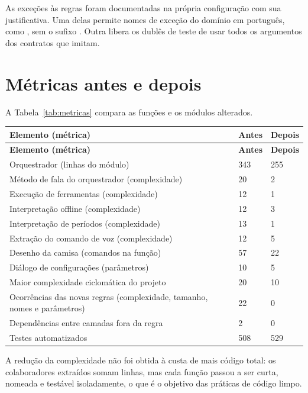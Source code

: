 As exceções às regras foram documentadas na própria configuração com sua justificativa. Uma delas
permite nomes de exceção do domínio em português, como , sem o sufixo
. Outra libera os dublês de teste de usar todos os argumentos dos contratos que imitam.

\section{Métricas antes e depois}

A Tabela~\ref{tab:metricas} compara as funções e os módulos alterados.

\begin{singlespace}
\label{tab:metricas}
\small
\begin{tabularx}{\textwidth}{LC{2.6cm}C{2.6cm}}
\toprule
\textbf{Elemento (métrica)} & \textbf{Antes} & \textbf{Depois} \\ \midrule
\endfirsthead
\toprule
\textbf{Elemento (métrica)} & \textbf{Antes} & \textbf{Depois} \\ \midrule
\endhead
Orquestrador (linhas do módulo) & 343 & 255 \\
Método de fala do orquestrador (complexidade) & 20 & 2 \\
Execução de ferramentas (complexidade) & 12 & 1 \\
Interpretação offline (complexidade) & 12 & 3 \\
Interpretação de períodos (complexidade) & 13 & 1 \\
Extração do comando de voz (complexidade) & 12 & 5 \\
Desenho da camisa (comandos na função) & 57 & 22 \\
Diálogo de configurações (parâmetros) & 10 & 5 \\
Maior complexidade ciclomática do projeto & 20 & 10 \\
Ocorrências das novas regras (complexidade, tamanho, nomes e parâmetros) & 22 & 0 \\
Dependências entre camadas fora da regra & 2 & 0 \\
Testes automatizados & 508 & 529 \\
\bottomrule
\end{tabularx}
\end{singlespace}

A redução da complexidade não foi obtida à custa de mais código total: os colaboradores extraídos
somam linhas, mas cada função passou a ser curta, nomeada e testável isoladamente, o que é o objetivo
das práticas de código limpo.
